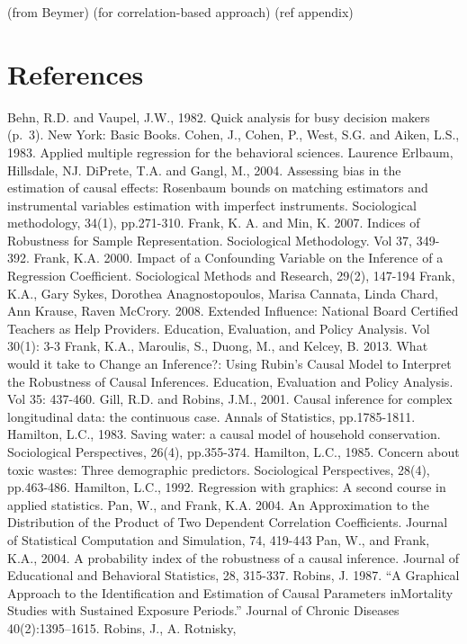 \documentclass[man]{apa6}
\begin{document}
(from Beymer) (for correlation-based approach) (ref appendix)

\section{References}\label{references}

Behn, R.D. and Vaupel, J.W., 1982. Quick analysis for busy decision
makers (p.~3). New York: Basic Books. Cohen, J., Cohen, P., West, S.G.
and Aiken, L.S., 1983. Applied multiple regression for the behavioral
sciences. Laurence Erlbaum, Hillsdale, NJ. DiPrete, T.A. and Gangl, M.,
2004. Assessing bias in the estimation of causal effects: Rosenbaum
bounds on matching estimators and instrumental variables estimation with
imperfect instruments. Sociological methodology, 34(1), pp.271-310.
Frank, K. A. and Min, K. 2007. Indices of Robustness for Sample
Representation. Sociological Methodology. Vol 37, 349-392. Frank, K.A.
2000. Impact of a Confounding Variable on the Inference of a Regression
Coefficient. Sociological Methods and Research, 29(2), 147-194 Frank,
K.A., Gary Sykes, Dorothea Anagnostopoulos, Marisa Cannata, Linda Chard,
Ann Krause, Raven McCrory. 2008. Extended Influence: National Board
Certified Teachers as Help Providers. Education, Evaluation, and Policy
Analysis. Vol 30(1): 3-3 Frank, K.A., Maroulis, S., Duong, M., and
Kelcey, B. 2013. What would it take to Change an Inference?: Using
Rubin's Causal Model to Interpret the Robustness of Causal Inferences.
Education, Evaluation and Policy Analysis. Vol 35: 437-460. Gill, R.D.
and Robins, J.M., 2001. Causal inference for complex longitudinal data:
the continuous case. Annals of Statistics, pp.1785-1811. Hamilton, L.C.,
1983. Saving water: a causal model of household conservation.
Sociological Perspectives, 26(4), pp.355-374. Hamilton, L.C., 1985.
Concern about toxic wastes: Three demographic predictors. Sociological
Perspectives, 28(4), pp.463-486. Hamilton, L.C., 1992. Regression with
graphics: A second course in applied statistics. Pan, W., and Frank,
K.A. 2004. An Approximation to the Distribution of the Product of Two
Dependent Correlation Coefficients. Journal of Statistical Computation
and Simulation, 74, 419-443 Pan, W., and Frank, K.A., 2004. A
probability index of the robustness of a causal inference. Journal of
Educational and Behavioral Statistics, 28, 315-337. Robins, J. 1987.
\enquote{A Graphical Approach to the Identification and Estimation of
Causal Parameters inMortality Studies with Sustained Exposure Periods.}
Journal of Chronic Diseases 40(2):1395--1615. Robins, J., A. Rotnisky,
\end{document}
